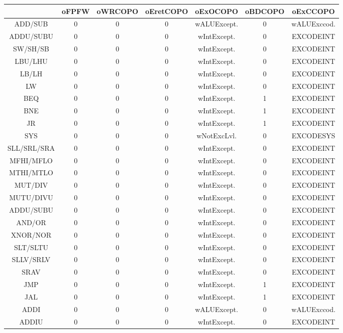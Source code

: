 \documentclass[12pt]{article}
\begin{document}
\begin{longtable}{|c|c|c|c|c|c|c|}
		\hline
		& oFPFW & oWRCOPO & oEretCOPO & oExOCOPO & oBDCOPO & oExCCOPO\\\hline
		ADD/SUB & 0 & 0 & 0 & wALUExcept. & 0 & wALUExccod.\\\hline	
		ADDU/SUBU & 0 & 0 & 0 & wIntExcept. & 0 & EXCODEINT\\\hline
		SW/SH/SB & 0 & 0 & 0 & wIntExcept. & 0 & EXCODEINT\\\hline
		LBU/LHU & 0 & 0 & 0 & wIntExcept. & 0 & EXCODEINT\\\hline
		LB/LH & 0 & 0 & 0 & wIntExcept. & 0 & EXCODEINT\\\hline
		LW & 0 & 0 & 0 & wIntExcept. & 0 & EXCODEINT\\\hline
		BEQ & 0 & 0 & 0 & wIntExcept. & 1 & EXCODEINT\\\hline	
		BNE & 0 & 0 & 0 & wIntExcept. & 1 & EXCODEINT\\\hline
		JR & 0 & 0 & 0 & wIntExcept. & 1 & EXCODEINT\\\hline
		SYS & 0 & 0 & 0 & wNotExcLvl. & 0 & EXCODESYS\\\hline
		SLL/SRL/SRA & 0 & 0 & 0 & wIntExcept. & 0 & EXCODEINT\\\hline
		MFHI/MFLO & 0 & 0 & 0 & wIntExcept. & 0 & EXCODEINT\\\hline
		MTHI/MTLO & 0 & 0 & 0 & wIntExcept. & 0 & EXCODEINT\\\hline
		MUT/DIV & 0 & 0 & 0 & wIntExcept. & 0 & EXCODEINT\\\hline
		MUTU/DIVU & 0 & 0 & 0 & wIntExcept. & 0 & EXCODEINT\\\hline
		ADDU/SUBU & 0 & 0 & 0 & wIntExcept. & 0 & EXCODEINT\\\hline
		AND/OR & 0 & 0 & 0 & wIntExcept. & 0 & EXCODEINT\\\hline
		XNOR/NOR & 0 & 0 & 0 & wIntExcept. & 0 & EXCODEINT\\\hline
		SLT/SLTU& 0 & 0 & 0 & wIntExcept. & 0 & EXCODEINT\\\hline
		SLLV/SRLV & 0 & 0 & 0 & wIntExcept. & 0 & EXCODEINT\\\hline
		SRAV & 0 & 0 & 0 & wIntExcept. & 0 & EXCODEINT\\\hline	
		JMP & 0 & 0 & 0 & wIntExcept. & 1 & EXCODEINT\\\hline
		JAL & 0 & 0 & 0 & wIntExcept. & 1 & EXCODEINT\\\hline
		ADDI & 0 & 0 & 0 &  wALUExcept. & 0 & wALUExccod.\\\hline
		ADDIU & 0 & 0 & 0 & wIntExcept. & 0 & EXCODEINT\\\hline

\end{longtable}
\end{document}
